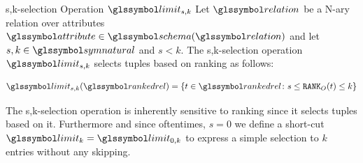 \begin{definition}[label=definition:rel_alg_sk_selection]{s,k-selection Operation $\limit_{s,k}$}{}
    Let $\relation$ be a N-ary relation over attributes $\attribute \in \schema (\relation)$ and let $s,k \in \symnatural$ and $s < k$. The s,k-selection operation $\limit_{s,k}$ selects tuples based on ranking as follows:

    \begin{equation*}
        \limit_{s,k}(\rankedrel) = \{ t \in \rankedrel \colon s \leq \mathtt{RANK}_{O}(t) \leq k \}
    \end{equation*}
\end{definition}

The s,k-selection operation is inherently sensitive to ranking since it selects tuples based on it. Furthermore and since oftentimes, $s = 0$ we define a short-cut $\limit_{k} = \limit_{0,k}$ to express a simple selection to $k$ entries without any skipping.

